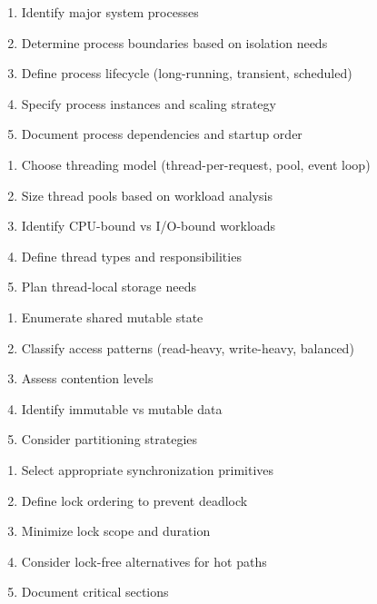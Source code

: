 \documentclass[11pt,letterpaper]{article}
\begin{document}
\begin{guidancebox}
\begin{enumerate}[nosep]
    \item Identify major system processes
    \item Determine process boundaries based on isolation needs
    \item Define process lifecycle (long-running, transient, scheduled)
    \item Specify process instances and scaling strategy
    \item Document process dependencies and startup order
\end{enumerate}
\end{guidancebox}

\begin{guidancebox}
\begin{enumerate}[nosep]
    \item Choose threading model (thread-per-request, pool, event loop)
    \item Size thread pools based on workload analysis
    \item Identify CPU-bound vs I/O-bound workloads
    \item Define thread types and responsibilities
    \item Plan thread-local storage needs
\end{enumerate}
\end{guidancebox}

\begin{guidancebox}
\begin{enumerate}[nosep]
    \item Enumerate shared mutable state
    \item Classify access patterns (read-heavy, write-heavy, balanced)
    \item Assess contention levels
    \item Identify immutable vs mutable data
    \item Consider partitioning strategies
\end{enumerate}
\end{guidancebox}

\begin{guidancebox}
\begin{enumerate}[nosep]
    \item Select appropriate synchronization primitives
    \item Define lock ordering to prevent deadlock
    \item Minimize lock scope and duration
    \item Consider lock-free alternatives for hot paths
    \item Document critical sections
\end{enumerate}
\end{guidancebox}
\end{document}
